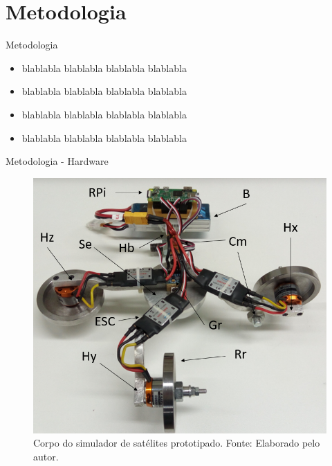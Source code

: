 \documentclass{beamer}
\begin{document}

\section{Metodologia}
\begin{frame}{Metodologia}
	\begin{itemize}
		\justifying
		\item blablabla blablabla blablabla blablabla 
		\item blablabla blablabla blablabla blablabla 
		\item blablabla blablabla blablabla blablabla 
		\item blablabla blablabla blablabla blablabla 
    \end{itemize}
\end{frame}


\begin{frame}{Metodologia - Hardware}
    \begin{figure}[HT]
		\begin{center}
		\captionsetup{justification=centering}
        \includegraphics[scale=.35]{../metodologia/img/corpo_real}
        \caption{Corpo do simulador de satélites prototipado. \newline
        		 Fonte: Elaborado pelo autor.}
		\label{FIG_ADAPTATIVO}
        \end{center}
	\end{figure}
\end{frame}
\end{document}
